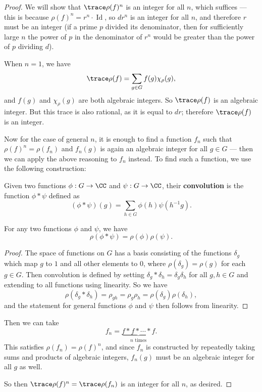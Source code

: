 \begin{proof}
    We will show that $\trace \rho(f)^n$ is an integer for all $n$, which suffices --- this is because $\rho(f)^n = r^n\cdot \operatorname{Id}$, so $dr^n$ is an integer for all $n$, and therefore $r$ must be an integer (if a prime $p$ divided its denominator, then for sufficiently large $n$ the power of $p$ in the denominator of $r^n$ would be greater than the power of $p$ dividing $d$). 

    When $n = 1$, we have \[\trace \rho(f) = \sum_{g \in G} f(g)\chi_\rho(g),\] and $f(g)$ and $\chi_\rho(g)$ are both algebraic integers. So $\trace \rho(f)$ is an algebraic integer. But this trace is also rational, as it is equal to $dr$; therefore $\trace \rho(f)$ is an integer. 
    
    Now for the case of general $n$, it is enough to find a function $f_n$ such that $\rho(f)^n = \rho(f_n)$ and $f_n(g)$ is again an algebraic integer for all $g \in G$ --- then we can apply the above reasoning to $f_n$ instead. To find such a function, we use the following construction: 
    
    \begin{definition}
    Given two functions $\phi : G \to \CC$ and $\psi : G \to \CC$, their \textbf{convolution} is the function $\phi * \psi$ defined as \[(\phi * \psi)(g) = \sum_{h \in G} \phi(h)\psi(h^{-1}g).\] 
    \end{definition}
    
    \begin{lemma}
        For any two functions $\phi$ and $\psi$, we have \[\rho(\phi * \psi) = \rho(\phi)\rho(\psi).\] 
    \end{lemma}
    
    \begin{proof}
    The space of functions on $G$ has a basis consisting of the functions $\delta_g$ which map $g$ to $1$ and all other elements to $0$, where $\rho(\delta_g) = \rho(g)$ for each $g \in G$. Then convolution is defined by setting $\delta_g * \delta_h = \delta_g\delta_h$ for all $g, h \in G$ and extending to all functions using linearity. So we have \[\rho(\delta_g * \delta_h) = \rho_{gh} = \rho_g\rho_h = \rho(\delta_g)\rho(\delta_h),\] and the statement for general functions $\phi$ and $\psi$ then follows from linearity. 
    \end{proof}
    
    Then we can take \[f_n = \underbrace{f * f * \cdots * f}_{n \text{ times}}.\] This satisfies $\rho(f_n) = \rho(f)^n$, and since $f_n$ is constructed by repeatedly taking sums and products of algebraic integers, $f_n(g)$ must be an algebraic integer for all $g$ as well. 
    
    So then $\trace \rho(f)^n = \trace \rho(f_n)$ is an integer for all $n$, as desired. 
\end{proof}    

